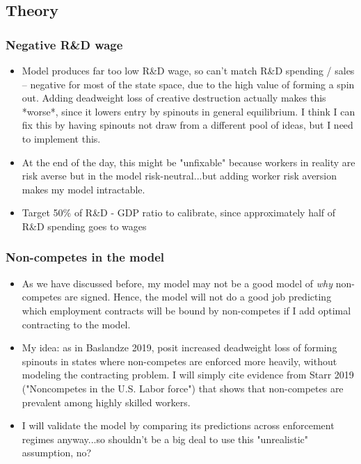 \documentclass[12pt,english]{article}
\theoremstyle{remark}
\begin{document}
\subsection{Theory}

\subsubsection{Negative R\&D wage}

\begin{itemize}
	\item Model produces far too low R\&D wage, so can't match R\&D spending / sales -- negative for most of the state space, due to the high value of forming a spin out. Adding deadweight loss of creative destruction actually makes this *worse*, since it lowers entry by spinouts in general equilibrium. I think I can fix this by having spinouts not draw from a different pool of ideas, but I need to implement this.
	\item At the end of the day, this might be "unfixable" because workers in reality are risk averse but in the model risk-neutral...but adding worker risk aversion makes my model intractable.
	\item Target 50\% of R\&D - GDP ratio to calibrate, since approximately half of R\&D spending goes to wages
\end{itemize}

\subsubsection{Non-competes in the model}

\begin{itemize}
	\item As we have discussed before, my model may not be a good model of \textit{why} non-competes are signed. Hence, the model will not do a good job predicting which employment contracts will be bound by non-competes if I add optimal contracting to the model. 
	\item My idea: as in Baslandze 2019, posit increased deadweight loss of forming spinouts in states where non-competes are enforced more heavily, without modeling the contracting problem. I will simply cite evidence from Starr 2019 ("Noncompetes in the U.S. Labor force") that shows that non-competes are prevalent among highly skilled workers. 
	\item I will validate the model by comparing its predictions across enforcement regimes anyway...so shouldn't be a big deal to use this "unrealistic" assumption, no?
\end{itemize}
\end{document}
